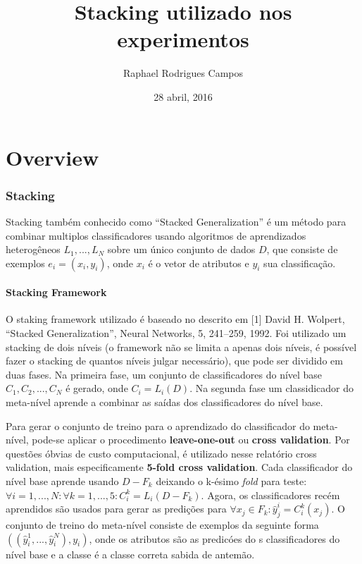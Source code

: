 \documentclass[]{book}
\title{Stacking utilizado nos experimentos}
\author{Raphael Rodrigues Campos}
\date{28 abril, 2016}
\begin{document}
\maketitle


\chapter{Overview}

\subsection{Stacking}\label{stacking}

Stacking também conhecido como ``Stacked Generalization'' é um método
para combinar multiplos classificadores usando algoritmos de
aprendizados heterogêneos \(L_1, ..., L_N\) sobre um único conjunto de
dados \(D\), que consiste de exemplos \(e_i = (x_i, y_i)\), onde \(x_i\)
é o vetor de atributos e \(y_i\) sua classificação.

\subsubsection{Stacking Framework}\label{stacking-framework}

O staking framework utilizado é baseado no descrito em {[}1{]} David H.
Wolpert, ``Stacked Generalization'', Neural Networks, 5, 241--259, 1992.
Foi utilizado um stacking de dois níveis (o framework não se limita a
apenas dois níveis, é possível fazer o stacking de quantos níveis julgar
necessário), que pode ser dividido em duas fases. Na primeira fase, um
conjunto de classificadores do nível base \(C_1, C_2, ..., C_N\) é
gerado, onde \(C_i = L_i(D)\). Na segunda fase um classidicador do
meta-nível aprende a combinar as saídas dos classificadores do nível
base.

Para gerar o conjunto de treino para o aprendizado do classificador do
meta-nível, pode-se aplicar o procedimento \textbf{leave-one-out} ou
\textbf{cross validation}. Por questões óbvias de custo computacional, é
utilizado nesse relatório cross validation, mais especificamente
\textbf{5-fold cross validation}. Cada classificador do nível base
aprende usando \(D - F_k\) deixando o k-ésimo \emph{fold} para teste:
\(\forall i = 1,...,N : \forall k = 1,...,5 : C^{k}_i = L_i(D-F_k)\).
Agora, os classificadores recém aprendidos são usados para gerar as
predições para \(\forall x_j \in F_k:\hat{y}_j^i=C^k_i(x_j)\). O
conjunto de treino do meta-nível consiste de exemplos da seguinte forma
\(((\hat{y}_i^1,..., \hat{y}_i^N), y_i)\), onde os atributos são as
predicóes do s classificadores do nível base e a classe é a classe
correta sabida de antemão.
\end{document}
